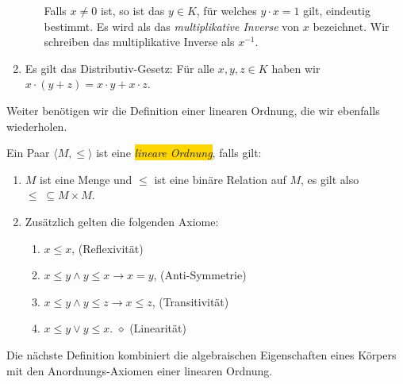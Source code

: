 \begin{Definition}[K\"orper]
\begin{enumerate}
\begin{enumerate}
            Falls $x \not= 0$ ist, so ist das $y \in K$, f\"ur welches $y \cdot x = 1$ gilt, eindeutig
            bestimmt.  Es wird als das \emph{multiplikative Inverse} von $x$   
            bezeichnet.  Wir schreiben das multiplikative Inverse als $x^{-1}$. 
            
      \end{enumerate}
\item Es gilt das Distributiv-Gesetz: F\"ur alle $x, y,z \in K$ haben wir
      \\[0.2cm]
      \hspace*{1.3cm} 
      $x \cdot (y + z) = x \cdot y + x \cdot z$.  \edx
\end{enumerate}
\end{Definition}

\noindent
Weiter ben\"otigen wir die Definition einer linearen Ordnung, die wir ebenfalls wiederholen.

\begin{Definition}
  Ein Paar $\langle M, \leq \rangle$ ist eine \colorbox{gold}{\emph{lineare Ordnung}}, falls gilt:
  \begin{enumerate}
  \item $M$ ist eine Menge und $\leq$ ist eine bin\"are Relation auf $M$, es gilt also
        \\[0.2cm]
        \hspace*{1.3cm}
        $\leq\; \subseteq M \times M$.
  \item Zus\"atzlich gelten die folgenden Axiome:
        \begin{enumerate}
        \item $x \leq x$,                 \hspace*{\fill} (Reflexivit\"at)
        \item $x \leq y \wedge y \leq x \rightarrow x = y$,  \hspace*{\fill} (Anti-Symmetrie)
        \item $x \leq y \wedge y \leq z \rightarrow x \leq z$,  \hspace*{\fill} (Transitivit\"at)
        \item $x \leq y \vee y \leq x$. \quad  $\diamond$   \hspace*{\fill} (Linearit\"at)
        \end{enumerate}
  \end{enumerate} 
\end{Definition} 

Die n\"achste Definition kombiniert die algebraischen Eigenschaften eines K\"orpers mit den
Anordnungs-Axiomen einer linearen Ordnung.

